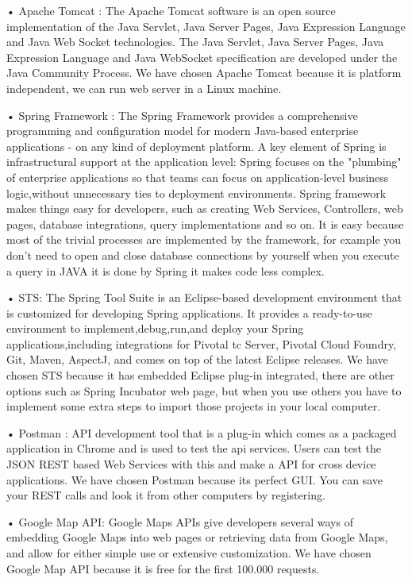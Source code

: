 • Apache Tomcat : The Apache Tomcat software is an open source implementation of the Java Servlet, Java Server Pages, Java Expression Language and Java Web Socket technologies. The Java Servlet, Java Server Pages, Java Expression Language and Java WebSocket specification are developed under the Java Community Process.\cite{TomcatTanim}
 We have chosen Apache Tomcat because it is platform independent, we can run web server in a Linux machine. 

• Spring Framework :  The Spring Framework provides a comprehensive programming and configuration model for modern Java-based enterprise applications - on any kind of deployment platform.
\cite{SpringFrameTanim}
 A key element of Spring is infrastructural support at the application level: Spring focuses on the "plumbing" of enterprise applications so that teams can focus on application-level business logic,without unnecessary ties to deployment environments. Spring framework makes things easy for developers, such as creating Web Services, Controllers, web pages, database integrations, query implementations and so on. It is easy because most of the trivial processes are implemented by the framework, for example you don't need to open and close database connections by yourself when you execute a query in JAVA it is done by Spring it makes code less complex.

• STS: The Spring Tool Suite is an Eclipse-based development environment that is customized for developing Spring applications. It provides a ready-to-use environment to implement,debug,run,and deploy your Spring applications,including integrations for Pivotal tc Server, Pivotal Cloud Foundry, Git, Maven, AspectJ, and comes on top of the latest Eclipse releases. 
\cite{STSTanim}
We have chosen STS because it has embedded Eclipse plug-in integrated, there are other options such as Spring Incubator web page, but when you use others you have to implement some extra steps to import those projects in your local computer.

• Postman : API development tool that is a plug-in which comes as a packaged application in Chrome and is used to test the api services. Users can test the JSON REST based Web Services with this and make a API for cross device applications. 
\cite{PostmanTanim}
We have chosen Postman because its perfect GUI. You can save your REST calls and look it from other computers by registering. 

• Google Map API: Google Maps APIs give developers several ways of embedding Google Maps into web pages or retrieving data from Google Maps, and allow for either simple use or extensive customization\cite{googleMapAPI}. 
We have chosen Google Map API because it is free for the first 100.000 requests.

